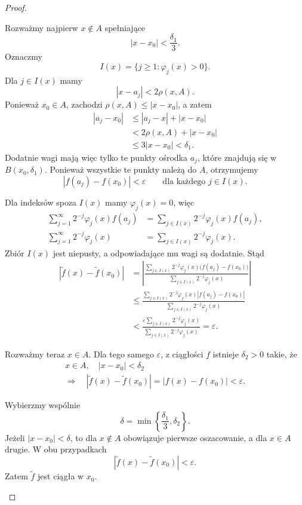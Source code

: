 \documentclass[12pt,a4paper]{article}
\theoremstyle{definition}
\theoremstyle{plain}
\begin{document}
\begin{proof}
\begin{enumerate}
  Rozważmy najpierw $x\notin A$ spełniające
  \[
    |x-x_0|<\frac{\delta_1}{3}.
  \]
  Oznaczmy
  \[
    I(x)=\{j\geq1:\varphi_j(x)>0\}.
  \]
  Dla $j\in I(x)$ mamy
  \[
    |x-a_j|<2\rho(x,A).
  \]
  Ponieważ $x_0\in A$, zachodzi $\rho(x,A)\leq|x-x_0|$, a zatem
  \[
  \begin{aligned}
    |a_j-x_0|
    &\leq|a_j-x|+|x-x_0|\\
    &<2\rho(x,A)+|x-x_0|\\
    &\leq3|x-x_0|<\delta_1.
  \end{aligned}
  \]
  Dodatnie wagi mają więc tylko te punkty ośrodka $a_j$, które znajdują się
  w $B(x_0,\delta_1)$. Ponieważ wszystkie te punkty należą do $A$, otrzymujemy
  \[
    |f(a_j)-f(x_0)|<\varepsilon
    \qquad\text{dla każdego }j\in I(x).
  \]

  Dla indeksów spoza $I(x)$ mamy $\varphi_j(x)=0$, więc
  \[
  \begin{aligned}
    \sum_{j=1}^{\infty}2^{-j}\varphi_j(x)f(a_j)
    &=\sum_{j\in I(x)}2^{-j}\varphi_j(x)f(a_j),\\
    \sum_{j=1}^{\infty}2^{-j}\varphi_j(x)
    &=\sum_{j\in I(x)}2^{-j}\varphi_j(x).
  \end{aligned}
  \]
  Zbiór $I(x)$ jest niepusty, a odpowiadające mu wagi są dodatnie. Stąd
  \[
  \begin{aligned}
    |\widetilde{f}(x)-\widetilde{f}(x_0)|
    &=
    \left|
    \frac{\sum_{j\in I(x)}2^{-j}\varphi_j(x)\bigl(f(a_j)-f(x_0)\bigr)}
         {\sum_{j\in I(x)}2^{-j}\varphi_j(x)}
    \right|\\[2mm]
    &\leq
    \frac{\sum_{j\in I(x)}2^{-j}\varphi_j(x)|f(a_j)-f(x_0)|}
         {\sum_{j\in I(x)}2^{-j}\varphi_j(x)}\\[2mm]
    &<
    \frac{\varepsilon\sum_{j\in I(x)}2^{-j}\varphi_j(x)}
         {\sum_{j\in I(x)}2^{-j}\varphi_j(x)}
    =\varepsilon.
  \end{aligned}
  \]

  Rozważmy teraz $x\in A$. Dla tego samego $\varepsilon$, z ciągłości $f$
  istnieje $\delta_2>0$ takie, że
  \[
  \begin{gathered}
    x\in A,\quad |x-x_0|<\delta_2\\
    \Longrightarrow\quad
    |\widetilde{f}(x)-\widetilde{f}(x_0)|
    =|f(x)-f(x_0)|<\varepsilon.
  \end{gathered}
  \]

  Wybierzmy wspólnie
  \[
    \delta=\min\left\{\frac{\delta_1}{3},\delta_2\right\}.
  \]
  Jeżeli $|x-x_0|<\delta$, to dla $x\notin A$ obowiązuje pierwsze oszacowanie,
  a dla $x\in A$ drugie. W obu przypadkach
  \[
    |\widetilde{f}(x)-\widetilde{f}(x_0)|<\varepsilon.
  \]
  Zatem $\widetilde{f}$ jest ciągła w $x_0$.\qedhere
\end{enumerate}
\end{proof}
\end{document}
